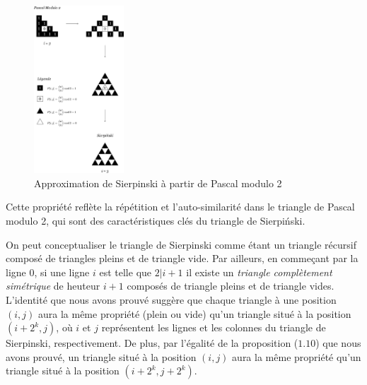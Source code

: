 \documentclass[16pt]{report}
\begin{document}
\begin{multicols*}{2}
        \begin{figure}[H]
            \includegraphics[width=0.3\textwidth]{PascalModulo2.jpg}
            \caption{Approximation de Sierpinski à partir de Pascal modulo 2}
        \end{figure}
        



        Cette propriété reflète la répétition et l'auto-similarité dans le triangle de Pascal modulo 2, 
        qui sont des caractéristiques clés du triangle de Sierpiński.

        On peut conceptualiser le triangle de Sierpinski comme étant un triangle récursif composé de triangles 
        pleins et de triangle vide. Par ailleurs, en commeçant par la ligne 0, 
        si une ligne $i$ est telle que $2|i + 1$  il existe un \textit{triangle complètement simétrique} 
        de heuteur $i + 1$ composés de triangle pleins et de triangle vides. L'identité que nous avons 
        prouvé suggère que chaque triangle à une position $(i,j)$ aura la même propriété 
        (plein ou vide) qu'un triangle situé à la position $(i + 2^k, j)$, où $i$ et $j$ représentent les 
        lignes et les colonnes du triangle de Sierpinski, respectivement. 
        De plus, par l'égalité de la proposition ($1.10$) 
        que nous avons prouvé, un triangle situé à la position $(i, j)$ aura la même propriété qu'un triangle 
        situé à la position $(i + 2^k, j + 2^k)$. 
        \end{multicols*}  
\end{document}
